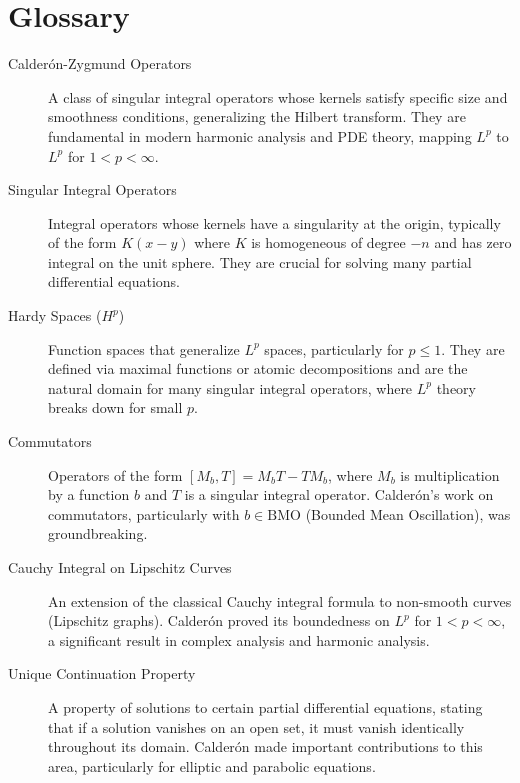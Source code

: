 \section*{Glossary}
\begin{description}
    \item[Calderón-Zygmund Operators] A class of singular integral operators whose kernels satisfy specific size and smoothness conditions, generalizing the Hilbert transform. They are fundamental in modern harmonic analysis and PDE theory, mapping $L^p$ to $L^p$ for $1 < p < \infty$.
    \item[Singular Integral Operators] Integral operators whose kernels have a singularity at the origin, typically of the form $K(x-y)$ where $K$ is homogeneous of degree $-n$ and has zero integral on the unit sphere. They are crucial for solving many partial differential equations.
    \item[Hardy Spaces ($H^p$)] Function spaces that generalize $L^p$ spaces, particularly for $p \le 1$. They are defined via maximal functions or atomic decompositions and are the natural domain for many singular integral operators, where $L^p$ theory breaks down for small $p$.
    \item[Commutators] Operators of the form $[M_b, T] = M_b T - T M_b$, where $M_b$ is multiplication by a function $b$ and $T$ is a singular integral operator. Calderón's work on commutators, particularly with $b \in \text{BMO}$ (Bounded Mean Oscillation), was groundbreaking.
    \item[Cauchy Integral on Lipschitz Curves] An extension of the classical Cauchy integral formula to non-smooth curves (Lipschitz graphs). Calderón proved its boundedness on $L^p$ for $1 < p < \infty$, a significant result in complex analysis and harmonic analysis.
    \item[Unique Continuation Property] A property of solutions to certain partial differential equations, stating that if a solution vanishes on an open set, it must vanish identically throughout its domain. Calderón made important contributions to this area, particularly for elliptic and parabolic equations.
\end{description}

